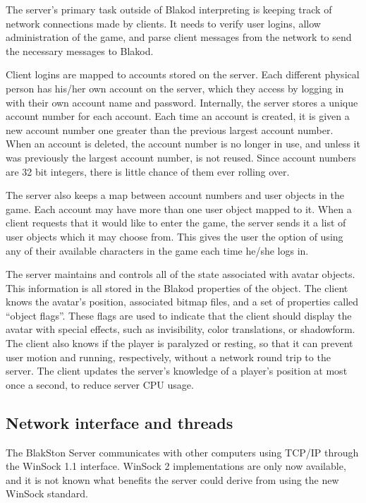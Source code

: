 The server's primary task outside of Blakod interpreting is keeping
track of network connections made by clients.  It needs to verify user
logins, allow administration of the game, and parse client messages
from the network to send the necessary messages to Blakod.

Client logins are mapped to accounts stored on the server.  Each different
physical person has his/her own account on the server, which they access
by logging in with their own account name and password.  Internally, the
server stores a unique account number for each account.  Each time an account
is created, it is given a new account number one greater than the previous
largest account number.  When an account is deleted, the account number
is no longer in use, and unless it was previously the largest account number,
is not reused.  Since account numbers are 32 bit integers, there is little
chance of them ever rolling over.

The server also keeps a map between account numbers and user objects in
the game.  Each account may have more than one user object mapped to it.
When a client requests that it would like to enter the game, the server
sends it a list of user objects which it may choose from.  This gives
the user the option of using any of their available characters in the game
each time he/she logs in.

The server maintains and controls all of the state associated with
avatar objects.  This information is all stored in the Blakod
properties of the object.  The client knows the avatar's position,
associated bitmap files, and a set of properties called ``object
flags''.  These flags are used to indicate that the client should
display the avatar with special effects, such as invisibility, color
translations, or shadowform.  The client also knows if the player is
paralyzed or resting, so that it can prevent user motion and running,
respectively, without a network round trip to the server.  The client
updates the server's knowledge of a player's position at most once a
second, to reduce server CPU usage.

\subsection{Network interface and threads}

The BlakSton Server communicates with other computers using TCP/IP
through the WinSock 1.1 interface.  WinSock 2 implementations are only
now available, and it is not known what benefits the server could
derive from using the new WinSock standard.

